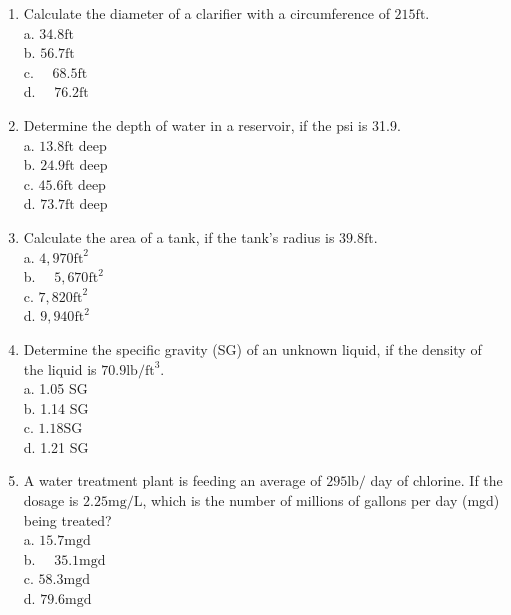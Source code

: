 \documentclass[10pt]{article}
\begin{document}
\begin{enumerate}
  \item Calculate the diameter of a clarifier with a circumference of $215 \mathrm{ft}$.\\
a. $34.8 \mathrm{ft}$\\
b. $56.7 \mathrm{ft}$\\
c. $\quad 68.5 \mathrm{ft}$\\
d. $\quad 76.2 \mathrm{ft}$

  \item Determine the depth of water in a reservoir, if the psi is 31.9.\\
a. $13.8 \mathrm{ft}$ deep\\
b. $24.9 \mathrm{ft}$ deep\\
c. $45.6 \mathrm{ft}$ deep\\
d. $73.7 \mathrm{ft}$ deep

  \item Calculate the area of a tank, if the tank's radius is $39.8 \mathrm{ft}$.\\
a. $4,970 \mathrm{ft}^{2}$\\
b. $\quad 5,670 \mathrm{ft}^{2}$\\
c. $7,820 \mathrm{ft}^{2}$\\
d. $9,940 \mathrm{ft}^{2}$

  \item Determine the specific gravity (SG) of an unknown liquid, if the density of the liquid is $70.9 \mathrm{lb} / \mathrm{ft}^{3}$.\\
a. 1.05 SG\\
b. 1.14 SG\\
c. $1.18 \mathrm{SG}$\\
d. 1.21 SG

  \item A water treatment plant is feeding an average of $295 \mathrm{lb} /$ day of chlorine. If the dosage is $2.25 \mathrm{mg} / \mathrm{L}$, which is the number of millions of gallons per day (mgd) being treated?\\
a. $15.7 \mathrm{mgd}$\\
b. $\quad 35.1 \mathrm{mgd}$\\
c. $58.3 \mathrm{mgd}$\\
d. $79.6 \mathrm{mgd}$


\end{enumerate}
\end{document}
